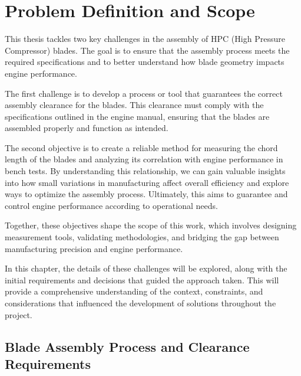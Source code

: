 
%

\chapter{Problem Definition and Scope}
\label{cha:definition}

This thesis tackles two key challenges in the assembly of HPC (High Pressure Compressor) blades. The goal is to ensure that the assembly process meets the required specifications and to better understand how blade geometry impacts engine performance.

The first challenge is to develop a process or tool that guarantees the correct assembly clearance for the blades. This clearance must comply with the specifications outlined in the engine manual, ensuring that the blades are assembled properly and function as intended.

The second objective is to create a reliable method for measuring the chord length of the blades and analyzing its correlation with engine performance in bench tests. By understanding this relationship, we can gain valuable insights into how small variations in manufacturing affect overall efficiency and explore ways to optimize the assembly process. Ultimately, this aims to guarantee and control engine performance according to operational needs.

Together, these objectives shape the scope of this work, which involves designing measurement tools, validating methodologies, and bridging the gap between manufacturing precision and engine performance.

In this chapter, the details of these challenges will be explored, along with the initial requirements and decisions that guided the approach taken. This will provide a comprehensive understanding of the context, constraints, and considerations that influenced the development of solutions throughout the project.

\section{Blade Assembly Process and Clearance Requirements}
\label{sec: bladeandclearence}


